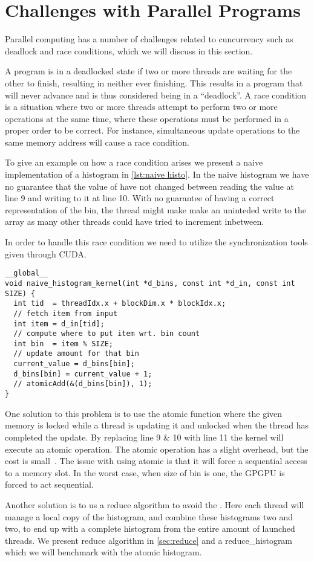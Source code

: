 \section{Challenges with Parallel Programs}
\label{sec:challenges with parallel programs}

Parallel computing has a number of challenges related to cuncurrency such as deadlock and race conditions, which we will discuss in this section.

A program is in a deadlocked state if two or more threads are waiting for the other to finish, resulting in neither ever finishing.
This results in a program that will never advance and is thus considered being in a ``deadlock''.
A race condition is a situation where two or more threads attempt to perform two or more operations at the same time, where these operations must be performed in a proper order to be correct.
For instance, simultaneous update operations to the same memory address will cause a race condition.~\cite{farber2011cuda}

To give an example on how a race condition arises we present a naive implementation of a histogram in \cref{lst:naive histo}.
In the naive histogram we have no guarantee that the value of  have not changed between reading the value at line 9 and writing to it at line 10.
With no guarantee of having a correct representation of the bin, the thread might make make an uninteded write to the array as many other threads could have tried to increment inbetween.

In order to handle this race condition we need to utilize the synchronization tools given through CUDA.

\begin{lstlisting}[caption={Naive histogram implementation with race condition}, label={lst:naive histo}]
__global__
void naive_histogram_kernel(int *d_bins, const int *d_in, const int SIZE) {
  int tid  = threadIdx.x + blockDim.x * blockIdx.x;
  // fetch item from input
  int item = d_in[tid];
  // compute where to put item wrt. bin count
  int bin  = item % SIZE;
  // update amount for that bin
  current_value = d_bins[bin];
  d_bins[bin] = current_value + 1;
  // atomicAdd(&(d_bins[bin]), 1);
}
\end{lstlisting}

One solution to this problem is to use the atomic function where the given memory is locked while a thread is updating it and unlocked when the thread has completed the update.
By replacing line 9 \& 10 with line 11 the kernel will execute an atomic operation.
The atomic operation has a slight overhead, but the cost is small~\cite{udacity}.
The issue with using atomic is that it will force a sequential access to a memory slot.
In the worst case, when size of bin is one, the GPGPU is forced to act sequential.

Another solution is to us a reduce algorithm to avoid the .
Here each thread will manage a local copy of the histogram, and combine these histograms two and two, to end up with a complete histogram from the entire amount of launched threads.
We present reduce algorithm in \cref{sec:reduce} and a reduce\_histogram which we will benchmark with the atomic histogram.
